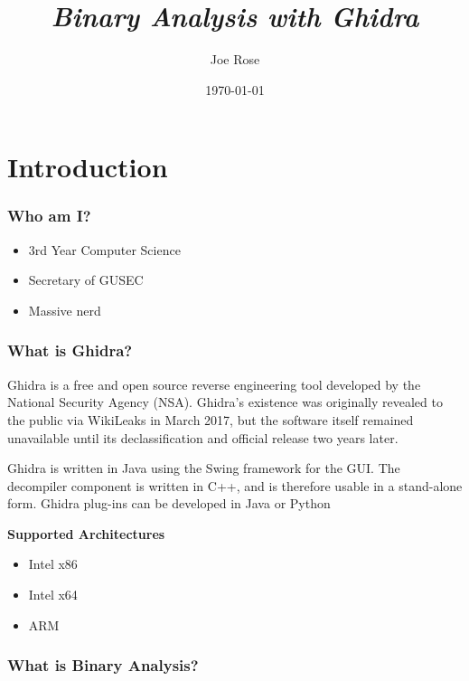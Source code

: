 \documentclass{beamer}
\title{\textit{Binary Analysis with Ghidra}}
\author{Joe Rose}
\institute{GUSEC}
\date{\today}
\begin{document}
	
	\frame{\titlepage}
	
	\section{Introduction}
	\begin{frame}
		\frametitle{Who am I?}
		\begin{itemize}
			\item 3rd Year Computer Science
			\item Secretary of GUSEC
			\item Massive nerd
		\end{itemize}
	\end{frame}

	\begin{frame}
		\frametitle{What is Ghidra?}
		Ghidra is a free and open source reverse engineering tool developed by the National Security Agency (NSA). Ghidra's existence was originally revealed to the public via WikiLeaks in March 2017, but the software itself remained unavailable until its declassification and official release two years later. 
		\newline
		
		Ghidra is written in Java using the Swing framework for the GUI. The decompiler component is written in C++, and is therefore usable in a stand-alone form. Ghidra plug-ins can be developed in Java or Python
		\newline
		
		\textbf{Supported Architectures}
		\begin{itemize}
			\item Intel x86
			\item Intel x64
			\item ARM
		\end{itemize}
		
	\end{frame}

	\begin{frame}
		\frametitle{What is Binary Analysis?}
		
		
		
	\end{frame}
		
	
\end{document}
